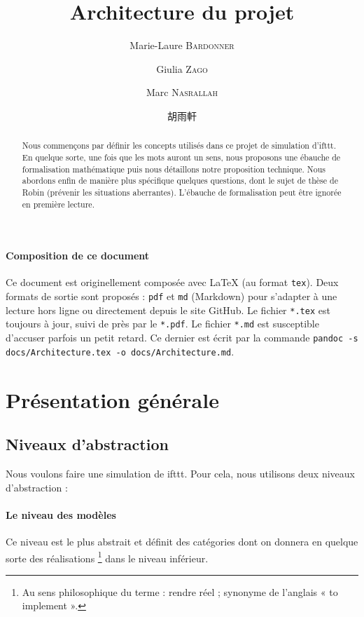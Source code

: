\documentclass[11pt]{article}
\title{Architecture du projet}
\author{Marie-Laure \textsc{Bardonner} \and Giulia \textsc{Zago} \and Marc \textsc{Nasrallah} \and 胡雨軒}
\begin{document}
\maketitle

\begin{abstract}
Nous commençons par définir les concepts utilisés dans ce projet de simulation d'ifttt. En quelque sorte, une fois que les mots auront un sens, nous proposons une ébauche de formalisation mathématique puis nous détaillons notre proposition technique. Nous abordons enfin de manière plus spécifique quelques questions, dont le sujet de thèse de Robin (prévenir les situations aberrantes). L'ébauche de formalisation peut être ignorée en première lecture.
\end{abstract}

\paragraph{Composition de ce document} Ce document est originellement composée avec \LaTeX{} (au format \texttt{tex}). Deux formats de sortie sont proposés : \texttt{pdf} et \texttt{md} (Markdown) pour s'adapter à une lecture hors ligne ou directement depuis le site GitHub. Le fichier \texttt{*.tex} est toujours à jour, suivi de près par le \texttt{*.pdf}. Le fichier \texttt{*.md} est susceptible d'accuser parfois un petit retard. Ce dernier est écrit par la commande \texttt{pandoc -s docs/Architecture.tex -o docs/Architecture.md}.

\tableofcontents

\section{Présentation générale}

\subsection{Niveaux d'abstraction}

Nous voulons faire une simulation de ifttt. Pour cela, nous utilisons deux niveaux d'abstraction :

\paragraph{Le niveau des modèles} Ce niveau est le plus abstrait et définit des catégories dont on donnera en quelque sorte des réalisations \footnote{Au sens philosophique du terme : rendre réel ; synonyme de l'anglais « to implement ».} dans le niveau inférieur.
\end{document}
